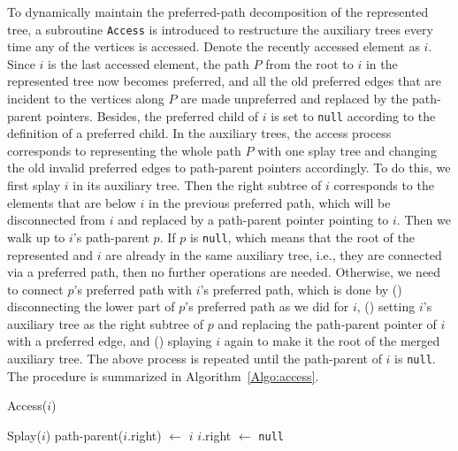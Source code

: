 To dynamically maintain the preferred-path decomposition of the represented tree, a subroutine \texttt{Access} is introduced
to restructure the auxiliary trees every time any of the vertices is accessed. Denote the recently accessed element as $i$.
Since $i$ is the last accessed element, the path $P$ from the root to $i$ in the represented tree now becomes preferred,
and all the old preferred edges that are incident to the vertices along $P$ are made unpreferred and replaced by the path-parent pointers.
Besides, the preferred child of $i$ is set to \texttt{null} according to the definition of a preferred child. In the auxiliary
trees, the access process corresponds to representing the whole path $P$ with one splay tree and changing the old invalid preferred edges to
path-parent pointers accordingly. To do this, we first splay $i$ in its auxiliary tree. Then the right subtree of $i$ corresponds
to the elements that are below $i$ in the previous preferred path, which will be disconnected from $i$ and replaced by a path-parent
pointer pointing to $i$. Then we walk up to $i$'s path-parent $p$. If $p$ is \texttt{null}, which means that the root of the
represented and $i$ are already in the same auxiliary tree, i.e., they are connected via a preferred path, then no further operations are needed.
Otherwise, we need to connect $p$'s preferred path with $i$'s preferred path, which is done by () disconnecting the lower part of
$p$'s preferred path as we did for $i$, () setting $i$'s auxiliary tree as the right subtree of $p$ and replacing the path-parent pointer of $i$ with
a preferred edge, and () splaying $i$ again to make it the root of the merged auxiliary tree. The above process is repeated until the path-parent
of $i$ is \texttt{null}. The procedure is summarized in Algorithm~\ref{Algo:access}.
\begin{algorithm}
\SetNoFillComment
\caption{Access($i$)} \label{Algo:access}
    Splay($i$) \;
    path-parent($i$.right) $\leftarrow$  $i$
    $i$.right $\leftarrow$ \texttt{null}\;
    \BlankLine
\end{algorithm}

